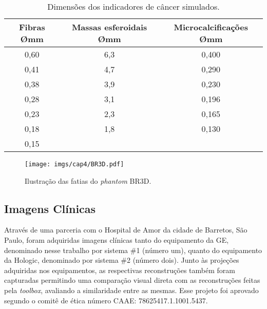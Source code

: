  \begin{table}[htb]
 	\centering
 	\caption{Dimensões dos indicadores de câncer simulados.}
 	\label{tab:tabCap4BR3D}
 	\begin{tabular}{c|c|c}
 		\textbf{Fibras {\O}mm}                                              & \textbf{Massas esferoidais {\O}mm} & \textbf{Microcalcificações {\O}mm} \\
 		[5pt]
 		\hline
 		\hline
 		\rule[0ex]{0pt}{3ex}
 		0,60 							 &             6,3             &            0,400            \\ \hline
 		\rule[0ex]{0pt}{3ex}
 		0,41                             &             4,7             &            0,290            \\ \hline
 		\rule[0ex]{0pt}{3ex}
 		0,38                             &             3,9             &            0,230            \\ \hline
 		\rule[0ex]{0pt}{3ex}
 		0,28                             &             3,1             &            0,196            \\ \hline
 		\rule[0ex]{0pt}{3ex}
 		0,23                             &             2,3             &            0,165            \\ \hline
 		\rule[0ex]{0pt}{3ex}
 		0,18                             &             1,8             &            0,130            \\ \hline
 		\rule[0ex]{0pt}{3ex}
 		0,15                             &                             &            	             \\ \hline
 	\end{tabular}
 	\vspace{2ex}
 \end{table}

\begin{figure}[htb]
	\caption{Ilustração das fatias do \textit{phantom} BR3D.}
	\begin{center}
		\texttt{[image: imgs/cap4/BR3D.pdf]}
	\end{center}
	\label{fig:imgCap4BR3D}
\end{figure} 

\subsection{Imagens Clínicas}

Através de uma parceria com o Hospital de Amor da cidade de Barretos, São Paulo, foram adquiridas imagens clínicas tanto do equipamento da \acs{GE}, denominado nesse trabalho por sistema \#1 (número um), quanto do equipamento da Hologic, denominado por sistema \#2 (número dois). Junto às projeções adquiridas nos equipamentos, as respectivas reconstruções também foram capturadas permitindo uma comparação visual direta com as reconstruções feitas pela \textit{toolbox}, avaliando a similaridade entre as mesmas. Esse projeto foi aprovado segundo o comitê de ética número CAAE: 78625417.1.1001.5437.

